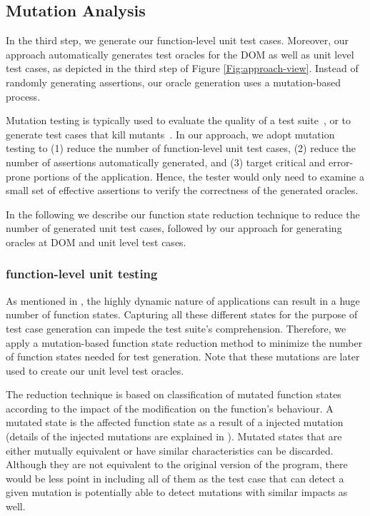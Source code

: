 \subsection{Mutation Analysis} \label{Sec:mutationAnalysis}
In the third step, we generate our function-level unit test cases. Moreover, our approach automatically generates test oracles for the DOM as well as unit level test cases, as depicted in the third step of Figure \ref{Fig:approach-view}. 
Instead of randomly generating assertions, our oracle generation uses a mutation-based process.

Mutation testing is typically used to evaluate the quality of a test suite~\cite{demillo:computer1978}, or to generate test cases that kill mutants~\cite{fraser:tse12}. In our approach, we adopt mutation testing to (1) reduce the number of function-level unit test cases, (2) reduce the number of assertions automatically generated, and (3) target critical  and error-prone portions of the application. 
Hence, the tester would only need to examine a small set of effective assertions to verify the correctness of the generated oracles.

In the following we describe our function state reduction technique to reduce the number of generated unit test cases, followed by our approach for generating oracles at DOM and unit level test cases.   

\subsubsection{\javascript function-level unit testing} \label{Sec:jsFuncTest}

As mentioned in , the highly dynamic nature of \javascript applications can result in a huge number of function states. Capturing all these different states for the purpose of test case generation can impede the test suite's comprehension. 
Therefore, we apply a mutation-based function state reduction method to minimize the number of function states needed for test generation. Note that these mutations are later used to create our unit level test oracles.

 The reduction technique is based on classification of mutated function states according to the impact of the modification on the function's behaviour. A mutated state is the affected function state as a result of a injected mutation (details of the injected mutations are explained in ). 
Mutated states that are either mutually equivalent or have similar characteristics can be discarded. Although they are not equivalent to the original version of the program, there would be less point in including all of them as the test case that can detect a given mutation is potentially able to detect mutations with similar impacts as well.

